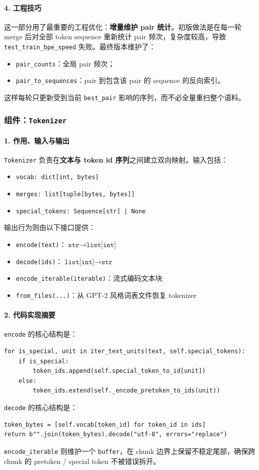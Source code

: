 \documentclass[UTF8,a4paper,11pt]{ctexart}
\begin{document}
\paragraph{4. 工程技巧}
这一部分用了最重要的工程优化：\textbf{增量维护 pair 统计}。初版做法是在每一轮 merge 后对全部 token sequence 重新统计 pair 频次，复杂度较高，导致 \texttt{test\_train\_bpe\_speed} 失败。最终版本维护了：
\begin{itemize}[leftmargin=2em]
  \item \texttt{pair\_counts}：全局 pair 频次；
  \item \texttt{pair\_to\_sequences}：pair 到包含该 pair 的 sequence 的反向索引。
\end{itemize}
这样每轮只更新受到当前 \texttt{best\_pair} 影响的序列，而不必全量重扫整个语料。

\subsubsection{组件：\texttt{Tokenizer}}
\paragraph{1. 作用、输入与输出}
\texttt{Tokenizer} 负责在\textbf{文本与 token id 序列}之间建立双向映射。输入包括：
\begin{itemize}[leftmargin=2em]
  \item \texttt{vocab: dict[int, bytes]}
  \item \texttt{merges: list[tuple[bytes, bytes]]}
  \item \texttt{special\_tokens: Sequence[str] | None}
\end{itemize}
输出行为则由以下接口提供：
\begin{itemize}[leftmargin=2em]
  \item \texttt{encode(text)}：\(\texttt{str} \to \texttt{list[int]}\)
  \item \texttt{decode(ids)}：\(\texttt{list[int]} \to \texttt{str}\)
  \item \texttt{encode\_iterable(iterable)}：流式编码文本块
  \item \texttt{from\_files(...)}：从 GPT-2 风格词表文件恢复 tokenizer
\end{itemize}

\paragraph{2. 代码实现摘要}
\texttt{encode} 的核心结构是：
\begin{lstlisting}
for is_special, unit in iter_text_units(text, self.special_tokens):
    if is_special:
        token_ids.append(self.special_token_to_id[unit])
    else:
        token_ids.extend(self._encode_pretoken_to_ids(unit))
\end{lstlisting}
\texttt{decode} 的核心结构是：
\begin{lstlisting}
token_bytes = [self.vocab[token_id] for token_id in ids]
return b"".join(token_bytes).decode("utf-8", errors="replace")
\end{lstlisting}
\texttt{encode\_iterable} 则维护一个 \texttt{buffer}，在 chunk 边界上保留不稳定尾部，确保跨 chunk 的 pretoken / special token 不被错误拆开。
\end{document}
